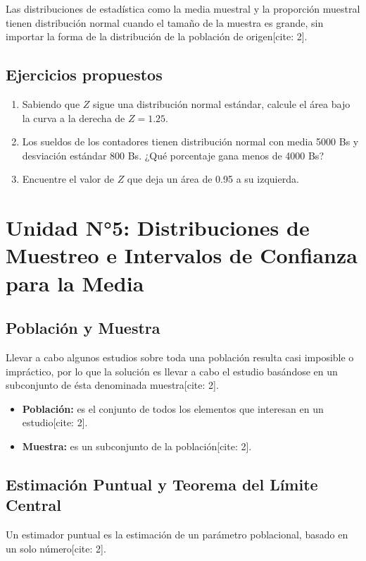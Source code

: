 \documentclass[12pt,a4paper]{book}
\begin{document}
Las distribuciones de estadística como la media muestral y la proporción muestral tienen distribución normal cuando el tamaño de la muestra es grande, sin importar la forma de la distribución de la población de origen[cite: 2].

\section{Ejercicios propuestos}
\begin{enumerate}
    \item Sabiendo que $Z$ sigue una distribución normal estándar, calcule el área bajo la curva a la derecha de $Z = 1.25$.
    \item Los sueldos de los contadores tienen distribución normal con media 5000 Bs y desviación estándar 800 Bs. ¿Qué porcentaje gana menos de 4000 Bs?
    \item Encuentre el valor de $Z$ que deja un área de 0.95 a su izquierda.
\end{enumerate}


\chapter{Unidad N°5: Distribuciones de Muestreo e Intervalos de Confianza para la Media}

\section{Población y Muestra}
Llevar a cabo algunos estudios sobre toda una población resulta casi imposible o impráctico, por lo que la solución es llevar a cabo el estudio basándose en un subconjunto de ésta denominada muestra[cite: 2].
\begin{itemize}
    \item \textbf{Población:} es el conjunto de todos los elementos que interesan en un estudio[cite: 2].
    \item \textbf{Muestra:} es un subconjunto de la población[cite: 2].
\end{itemize}

\section{Estimación Puntual y Teorema del Límite Central}
Un estimador puntual es la estimación de un parámetro poblacional, basado en un solo número[cite: 2]. 
\end{document}
